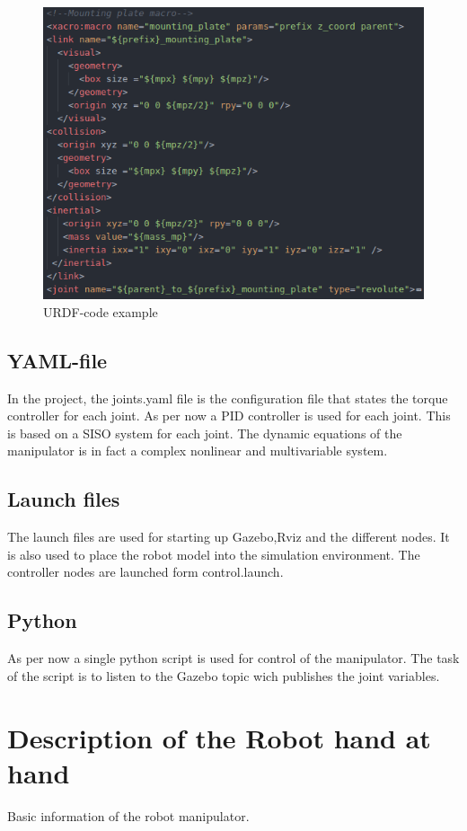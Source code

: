 \begin{figure}[htbp]
  \centering
  \includegraphics[width=.7\textwidth]{img/urdf_code_example.png}
  \caption{URDF-code example}
  \label{fig:urdf_code_example}
\end{figure}




\subsection{YAML-file}
In the project, the joints.yaml file is the configuration file that states the torque controller for each joint. As per now a PID controller is used for each joint. This is based on a SISO system for each joint. The dynamic equations of the manipulator is in fact a complex nonlinear and multivariable system. 

\subsection{Launch files}
The launch files are used for starting up Gazebo,Rviz and the different nodes. It is also used to place the robot model into the simulation environment. The controller nodes are launched form control.launch.





\subsection{Python}
As per now a single python script is used for control of the manipulator. The task of the script is to listen to the Gazebo topic wich publishes the joint variables. 


\section{Description of the Robot hand at hand}
Basic information of the robot manipulator. 


